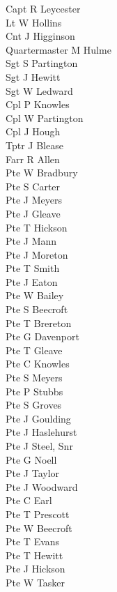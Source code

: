 \begin{multicols}{3}
  \small
  \noindent
  Capt R Leycester \\
  Lt W Hollins \\
  Cnt J Higginson \\
  Quartermaster M Hulme \\
  Sgt S Partington \\
  Sgt J Hewitt \\
  Sgt W Ledward \\
  Cpl P Knowles \\
  Cpl W Partington \\
  Cpl J Hough \\
  Tptr J Blease \\
  Farr R Allen \\
  Pte W Bradbury \\
  Pte S Carter \\
  Pte J Meyers \\
  Pte J Gleave \\
  Pte T Hickson \\
  Pte J Mann \\
  Pte J Moreton \\
  Pte T Smith \\
  Pte J Eaton \\
  Pte W Bailey \\
  Pte S Beecroft \\
  Pte T Brereton \\
  Pte G Davenport \\
  Pte T Gleave \\
  Pte C Knowles \\
  Pte S Meyers \\
  Pte P Stubbs \\
  Pte S Groves \\
  Pte J Goulding \\
  Pte J Haslehurst \\
  Pte J Steel, Snr \\
  Pte G Noell \\
  Pte J Taylor \\
  Pte J Woodward \\
  Pte C Earl \\
  Pte T Prescott \\
  Pte W Beecroft \\
  Pte T Evans \\
  Pte T Hewitt \\
  Pte J Hickson \\
  Pte W Tasker \\

\end{multicols}
